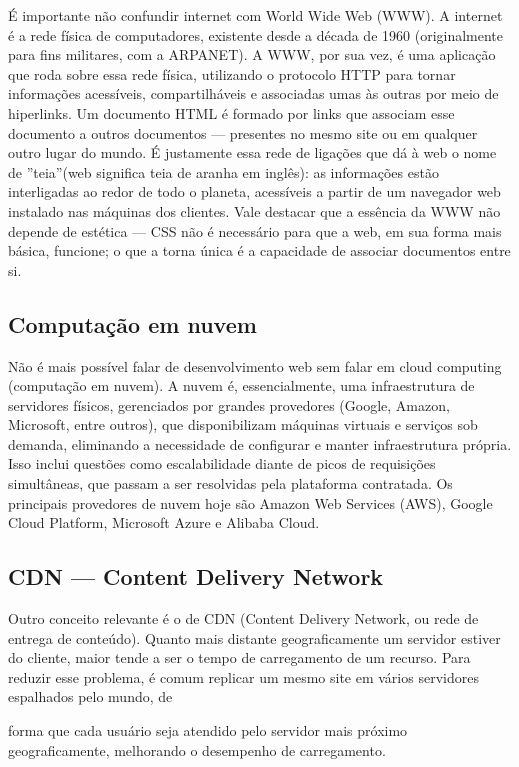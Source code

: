 É importante não confundir internet com World Wide Web (WWW). A internet é a rede física de computadores, existente desde a década de 1960 (originalmente para fins militares, com a ARPANET). A WWW, por sua vez, é uma aplicação que roda sobre essa rede física, utilizando o protocolo HTTP para tornar informações acessíveis, compartilháveis e associadas umas às outras por meio de hiperlinks. Um documento HTML é formado por links que associam esse documento a outros documentos — presentes no mesmo site ou em qualquer outro lugar do mundo. É justamente essa rede de ligações que dá à web o nome de ”teia”(web significa teia de aranha em inglês): as informações estão interligadas ao redor de todo o planeta, acessíveis a partir de um navegador web instalado nas máquinas dos clientes. Vale destacar que a essência da WWW não depende de estética — CSS não é necessário para que a web, em sua forma mais básica, funcione; o que a torna única é a capacidade de associar documentos entre si.

\subsection{Computação em nuvem}

Não é mais possível falar de desenvolvimento web sem falar em cloud computing (computação em nuvem). A nuvem é, essencialmente, uma infraestrutura de servidores físicos, gerenciados por grandes provedores (Google, Amazon, Microsoft, entre outros), que disponibilizam máquinas virtuais e serviços sob demanda, eliminando a necessidade de configurar e manter infraestrutura própria. Isso inclui questões como escalabilidade diante de picos de requisições simultâneas, que passam a ser resolvidas pela plataforma contratada. Os principais provedores de nuvem hoje são Amazon Web Services (AWS), Google Cloud Platform, Microsoft Azure e Alibaba Cloud.

\subsection{CDN — Content Delivery Network}

Outro conceito relevante é o de CDN (Content Delivery Network, ou rede de entrega de conteúdo). Quanto mais distante geograficamente um servidor estiver do cliente, maior tende a ser o tempo de carregamento de um recurso. Para reduzir esse problema, é comum replicar um mesmo site em vários servidores espalhados pelo mundo, de

forma que cada usuário seja atendido pelo servidor mais próximo geograficamente, melhorando o desempenho de carregamento.


